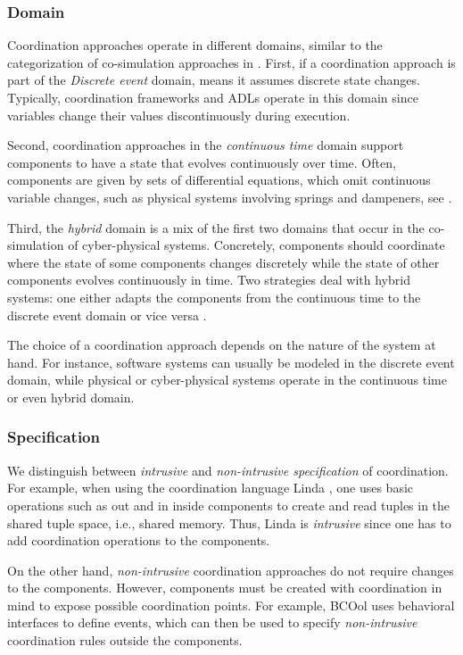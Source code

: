 \documentclass[runningheads]{llncs}
\begin{document}
\subsubsection{Domain} Coordination approaches operate in different domains, similar to the categorization of co-simulation approaches in \cite{gomesCoSimulationSurvey2019}.
First, if a coordination approach is part of the \textit{Discrete event} domain, means it assumes discrete state changes.
Typically, coordination frameworks and ADLs operate in this domain since variables change their values discontinuously during execution.

Second, coordination approaches in the \textit{continuous time} domain support components to have a state that evolves continuously over time.
Often, components are given by sets of differential equations, which omit continuous variable changes, such as physical systems involving springs and dampeners, see \cite{gomesCoSimulationSurvey2019}.

Third, the \textit{hybrid} domain is a mix of the first two domains that occur in the co-simulation of cyber-physical systems.
Concretely, components should coordinate where the state of some components changes discretely while the state of other components evolves continuously in time.
Two strategies deal with hybrid systems: one either adapts the components from the continuous time to the discrete event domain or vice versa \cite{gomesCoSimulationSurvey2019}.

The choice of a coordination approach depends on the nature of the system at hand.
For instance, software systems can usually be modeled in the discrete event domain, while physical or cyber-physical systems operate in the continuous time or even hybrid domain.

\subsubsection{Specification} We distinguish between \textit{intrusive} and \textit{non-intrusive specification} of coordination.
For example, when using the coordination language Linda \cite{carrieroLindaContext1989}, one uses basic operations such as \textsf{out} and \textsf{in} inside components to create and read tuples in the shared tuple space, i.e., shared memory.
Thus, Linda is \textit{intrusive} since one has to add coordination operations to the components.

On the other hand, \textit{non-intrusive} coordination approaches do not require changes to the components.
However, components must be created with coordination in mind to expose possible coordination points.
For example, BCOol \cite{varalarsenBehavioralCoordinationOperator2015} uses behavioral interfaces to define events, which can then be used to specify \textit{non-intrusive} coordination rules outside the components.
\end{document}
